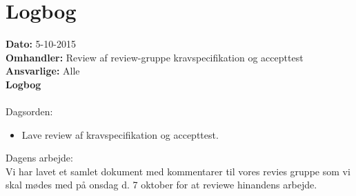\section{Logbog}

\textbf{Dato:} 5-10-2015 \\
\textbf{Omhandler:} Review af review-gruppe kravspecifikation og accepttest \\
\textbf{Ansvarlige:} Alle\\
\textbf{Logbog}
\\
\\
Dagsorden:
\begin{itemize}
	\item Lave review af kravspecifikation og accepttest. 
\end{itemize}

Dagens arbejde: \\
Vi har lavet et samlet dokument med kommentarer til vores revies gruppe som vi skal mødes med på onsdag d. 7 oktober for at reviewe hinandens arbejde. \\



